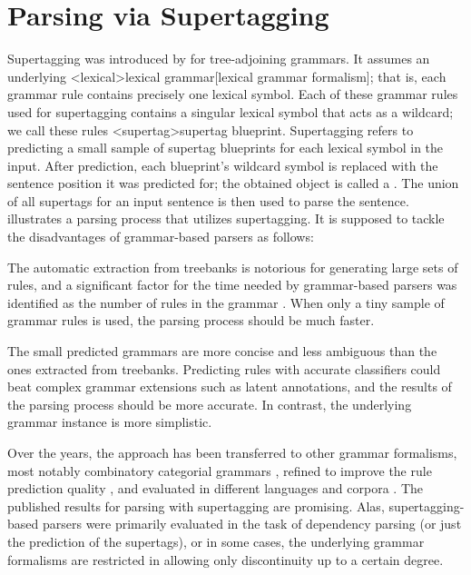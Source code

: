 \documentclass[../document.tex]{subfiles}
\begin{document}
    \section*{Parsing via Supertagging}
    Supertagging was introduced by \citet{bangalore1999supertagging} for tree-adjoining grammars.
    It assumes an underlying <lexical>{lexical grammar}[lexical grammar formalism]; that is, each grammar rule contains precisely one lexical symbol.
    Each of these grammar rules used for supertagging contains a singular lexical symbol that acts as a wildcard; we call these rules <supertag>{supertag blueprint}.
    Supertagging refers to predicting a small sample of supertag blueprints for each lexical symbol in the input.
    After prediction, each blueprint's wildcard symbol is replaced with the sentence position it was predicted for; the obtained object is called a .
    The union of all supertags for an input sentence is then used to parse the sentence.
     illustrates a parsing process that utilizes supertagging.
    It is supposed to tackle the disadvantages of grammar-based parsers as follows:
    \begin{compactitem}
        \item The automatic extraction from treebanks is notorious for generating large sets of rules, and a significant factor for the time needed by grammar-based parsers was identified as the number of rules in the grammar \citep{dunlop2010reducing}.
            When only a tiny sample of grammar rules is used, the parsing process should be much faster.
        \item The small predicted grammars are more concise and less ambiguous than the ones extracted from treebanks.
            Predicting rules with accurate classifiers could beat complex grammar extensions such as latent annotations, and the results of the parsing process should be more accurate. In contrast, the underlying grammar instance is more simplistic.
    \end{compactitem}
    Over the years, the approach has been transferred to other grammar formalisms, most notably combinatory categorial grammars \citep{Clark04}, refined to improve the rule prediction quality \citep{vaswani2016supertagging,Kad18,tian20}, and evaluated in different languages and corpora \citep{Bla18}.
    The published results for parsing with supertagging are promising.
    Alas, supertagging-based parsers were primarily evaluated in the task of dependency parsing (or just the prediction of the supertags), or in some cases, the underlying grammar formalisms are restricted in allowing only discontinuity up to a certain degree.
\end{document}
